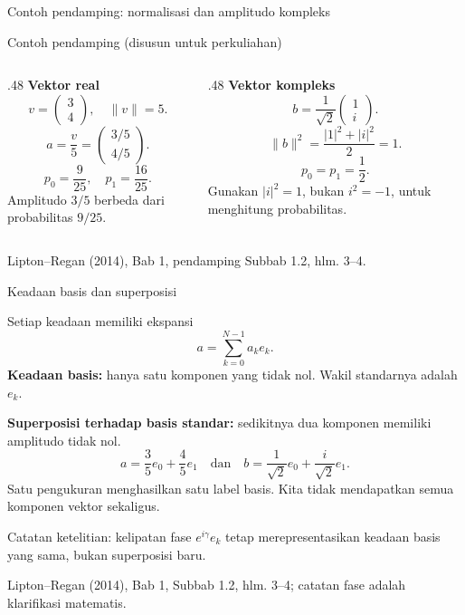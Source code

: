 \documentclass[aspectratio=169,11pt]{beamer}
\newcommand{\bookref}[1]{\par\vfill{\scriptsize\color{gray}Lipton--Regan (2014), Bab 1, #1.}}
\newcommand{\extra}{\par\textcolor{AcademicBlue}{\small Contoh pendamping (disusun untuk perkuliahan)}\par}
\begin{document}
\begin{frame}{Contoh pendamping: normalisasi dan amplitudo kompleks}

\extra
\begin{columns}[T]
\begin{column}{.48\textwidth}
\textbf{Vektor real}
\[
 v=\begin{pmatrix}3\\4\end{pmatrix},\quad \|v\|=5.
\]
\[
 a=\frac v5=\begin{pmatrix}3/5\\4/5\end{pmatrix}.
\]
\[
 p_0=\frac9{25},\quad p_1=\frac{16}{25}.
\]
Amplitudo $3/5$ berbeda dari probabilitas $9/25$.
\end{column}
\begin{column}{.48\textwidth}
\textbf{Vektor kompleks}
\[
 b=\frac1{\sqrt2}\begin{pmatrix}1\\i\end{pmatrix}.
\]
\[
 \|b\|^2=\frac{|1|^2+|i|^2}{2}=1.
\]
\[
 p_0=p_1=\frac12.
\]
Gunakan $|i|^2=1$, bukan $i^2=-1$, untuk menghitung probabilitas.
\end{column}
\end{columns}
\bookref{pendamping Subbab 1.2, hlm. 3--4}

\end{frame}

\begin{frame}{Keadaan basis dan superposisi}
\setlength{\abovedisplayskip}{5pt}\setlength{\belowdisplayskip}{5pt}

Setiap keadaan memiliki ekspansi
\[
 a=\sum_{k=0}^{N-1}a_ke_k.
\]
\textbf{Keadaan basis:} hanya satu komponen yang tidak nol. Wakil standarnya adalah $e_k$.
\par\medskip
\textbf{Superposisi terhadap basis standar:} sedikitnya dua komponen memiliki amplitudo tidak nol.
\[
 a=\frac35e_0+\frac45e_1
 \quad\text{dan}\quad
 b=\frac1{\sqrt2}e_0+\frac{i}{\sqrt2}e_1.
\]
Satu pengukuran menghasilkan satu label basis. Kita tidak mendapatkan semua komponen vektor sekaligus.
\par\medskip
{\small Catatan ketelitian: kelipatan fase $e^{i\gamma}e_k$ tetap merepresentasikan keadaan basis yang sama, bukan superposisi baru.}
\vspace{-4pt}
\bookref{Subbab 1.2, hlm. 3--4; catatan fase adalah klarifikasi matematis}

\end{frame}
\end{document}
